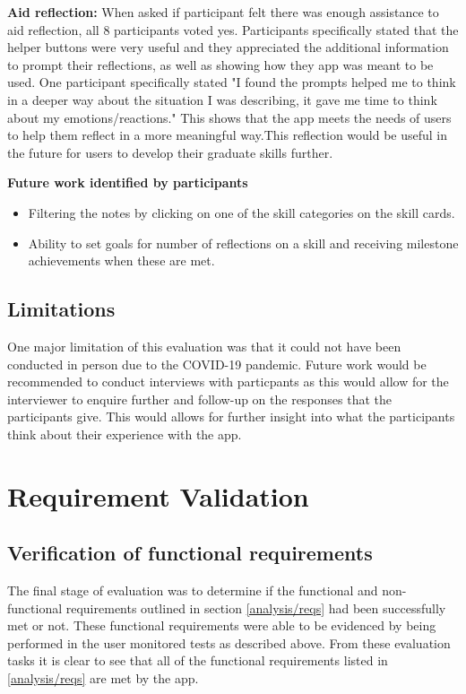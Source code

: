 \documentclass{l4proj}
\begin{document}
\textbf{Aid reflection:} When asked if participant felt there was enough assistance to aid reflection, all 8 participants voted yes. Participants specifically stated that the helper buttons were very useful and they appreciated the additional information to prompt their reflections, as well as showing how they app was meant to be used. One participant specifically stated "I found the prompts helped me to think in a deeper way about the situation I was describing, it gave me time to think about my emotions/reactions." This shows that the app meets the needs of users to help them reflect in a more meaningful way.This reflection would be useful in the future for users to develop their graduate skills further.


\textbf{Future work identified by participants}
\begin{itemize}
    \item Filtering the notes by clicking on one of the skill categories on the skill cards.
    \item Ability to set goals for number of reflections on a skill and receiving milestone achievements when these are met.
\end{itemize}

\subsection{Limitations}
One major limitation of this evaluation was that it could not have been conducted in person due to the COVID-19 pandemic. Future work would be recommended to conduct interviews with particpants as this would allow for the interviewer to enquire further and follow-up on the responses that the participants give. This would allows for further insight into what the participants think about their experience with the app.

\section{Requirement Validation}

\subsection{Verification of functional requirements}

The final stage of evaluation was to determine if the functional and non-functional requirements outlined in section \ref{analysis/reqs} had been successfully met or not. These functional requirements were able to be evidenced by being performed in the user monitored tests as described above. From these evaluation tasks it is clear to see that all of the functional requirements listed in \ref{analysis/reqs} are met by the app.
\end{document}

